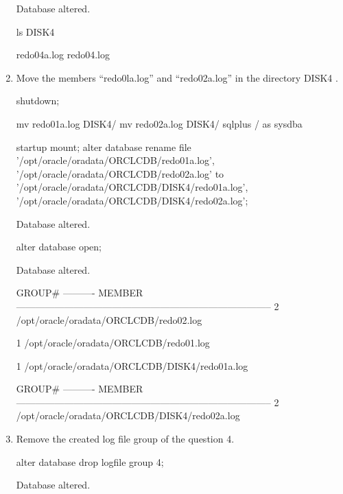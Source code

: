\documentclass{article}
\begin{document}
\begin{enumerate}
\begin{messageshell}
Database altered.

\end{messageshell}
\begin{commandshell}
ls DISK4
\end{commandshell}
\begin{messageshell}
redo04a.log  redo04.log
\end{messageshell}
\item Move the members “redo0la.log” and “redo02a.log” in the directory DISK4 .
\begin{sqlshell}
shutdown;
\end{sqlshell}
\begin{commandshell}
mv redo01a.log DISK4/
mv redo02a.log DISK4/
sqlplus / as sysdba
\end{commandshell}
\begin{sqlshell}
startup mount;
alter database rename file '/opt/oracle/oradata/ORCLCDB/redo01a.log', '/opt/oracle/oradata/ORCLCDB/redo02a.log' to '/opt/oracle/oradata/ORCLCDB/DISK4/redo01a.log', '/opt/oracle/oradata/ORCLCDB/DISK4/redo02a.log';
\end{sqlshell}
\begin{messageshell}
Database altered.

\end{messageshell}
\begin{sqlshell}
alter database open;
\end{sqlshell}
\begin{messageshell}
Database altered.

\end{messageshell}
\begin{messageshell}

    GROUP#
----------
MEMBER
--------------------------------------------------------------------------------
        2
/opt/oracle/oradata/ORCLCDB/redo02.log

        1
/opt/oracle/oradata/ORCLCDB/redo01.log

        1
/opt/oracle/oradata/ORCLCDB/DISK4/redo01a.log


    GROUP#
----------
MEMBER
--------------------------------------------------------------------------------
        2
/opt/oracle/oradata/ORCLCDB/DISK4/redo02a.log


\end{messageshell}
\item Remove the created log file group of the question 4.
\begin{sqlshell}
alter database drop logfile group 4;
\end{sqlshell}
\begin{messageshell}
Database altered.


\end{messageshell}
\end{enumerate}
\end{document}
